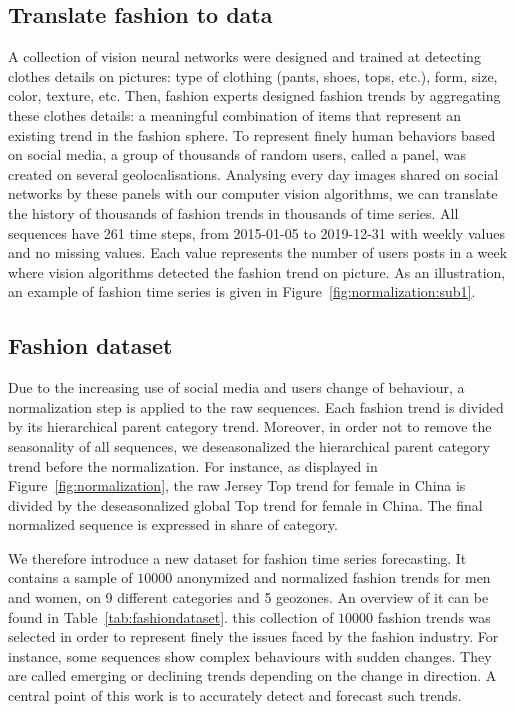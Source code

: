 \documentclass{article} %
\newcommand{\numberts}{10000}
\begin{document}
\subsection{Translate fashion to data}
\label{sec:dataset:a}
A collection of vision neural networks were designed and trained  at detecting clothes details on pictures: type of clothing (pants, shoes, tops, etc.), form, size, color, texture, etc. Then, fashion experts designed fashion trends by aggregating these clothes details: a meaningful combination of items that represent an existing trend in the fashion sphere. To represent finely human behaviors based on social media, a group of thousands of random users, called a panel, was created on several geolocalisations. Analysing every day images shared on social networks by these panels with our computer vision algorithms, we can translate the history of thousands of fashion trends in thousands of time series.  All sequences have 261 time steps, from 2015-01-05 to 2019-12-31 with weekly values and no missing values. Each value represents the number of users posts in a week where vision algorithms detected the fashion trend on picture.  As an illustration, an example of fashion time series is given in Figure~\ref{fig:normalization:sub1}.

\subsection{Fashion dataset}
\label{sec:dataset:b}

Due to the increasing use of social media and users change of behaviour, a normalization step is applied to the raw sequences. Each fashion trend is divided by its hierarchical parent category trend. Moreover, in order not to remove the seasonality of all sequences, we deseasonalized the hierarchical parent category trend before the normalization. For instance, as displayed in Figure~\ref{fig:normalization}, the raw Jersey Top trend for female in China is divided by the deseasonalized global Top trend for female in China. The final normalized sequence is expressed in share of category.

We therefore introduce a new dataset for fashion time series forecasting.  It contains a sample of $\numberts$ anonymized and  normalized fashion trends for men and women, on 9 different categories and 5 geozones. An overview of it can be found in Table~\ref{tab:fashiondataset}. this collection of $\numberts$ fashion trends was selected in order to represent finely the issues faced by the fashion industry. For instance, some sequences show complex behaviours with sudden changes. They are called emerging or declining trends depending on the change in direction. A central point of this work is to accurately detect and forecast such trends.
\end{document}
